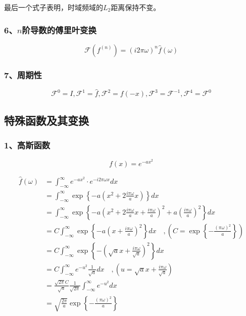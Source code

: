 		最后一个式子表明，时域频域的$L_2$距离保持不变。
	\subsubsection*{6、$n$阶导数的傅里叶变换}
		$$
			\mathcal{F}(f^{(n)}) = (i2\pi\omega)^n \hat{f}(\omega)
		$$
	\subsubsection*{7、周期性}
		$$
			\mathcal{F}^0 = I, 
			\mathcal{F}^1 = \hat{f}, 
			\mathcal{F}^2 = f(-x), 
			\mathcal{F}^3 = \mathcal{F}^{-1},
			\mathcal{F}^4 = \mathcal{F}^0
		$$

\subsection{特殊函数及其变换}
	\subsubsection*{1、高斯函数}
		$$ f(x) = e^{-ax^2} $$

		\begin{align*}
			\hat{f}(\omega) 
				&= \int_{-\infty}^{\infty} e^{-ax^2}\cdot e^{-i2\pi\omega x}dx\\
				&= \int_{-\infty}^{\infty}  
					\exp\left\lbrace
						-a\left(
							x^2 + 2\frac{i\pi\omega}{a} x
						\right)
					\right\rbrace dx\\
				&=  \int_{-\infty}^{\infty}  
					\exp\left\lbrace
						-a\left(
							x^2 + 2\frac{i\pi\omega}{a} x + \frac{i\pi\omega}{a}
						\right)^2 + a\left(\frac{i\pi\omega}{a}\right)^2
					\right\rbrace dx\\
				&= C\int_{-\infty}^{\infty} \exp \left\lbrace
						-a\left(
							x+\frac{i\pi\omega}{a}
						\right)^2
					\right\rbrace dx\quad ,
					\left(
						C = \exp\left\lbrace
								-\frac{(\pi\omega)^2}{a}
					\right\rbrace\right)\\
				&= C\int_{-\infty}^{\infty} \exp \left\lbrace
						-\left(
							\sqrt{a}x+\frac{i\pi\omega}{\sqrt{a}}
						\right)^2
					\right\rbrace dx\\
				& = C\int_{-\infty}^{\infty} 
							e^{-u^2}
					 \frac{1}{\sqrt{a}}dx\quad , \left(u = \sqrt{a}x+\frac{i\pi\omega}{\sqrt{a}}\right)\\
				&= \frac{\sqrt{2\pi}C}{\sqrt{a}}
					\frac{1}{\sqrt{2\pi}}\int_{-\infty}^{\infty} e^{-u^2}dx\\
				&= \sqrt{\frac{2\pi}{a}}
							\exp
								\left\lbrace
									-\frac{(\pi\omega)^2}{a}
								\right\rbrace
		\end{align*}

